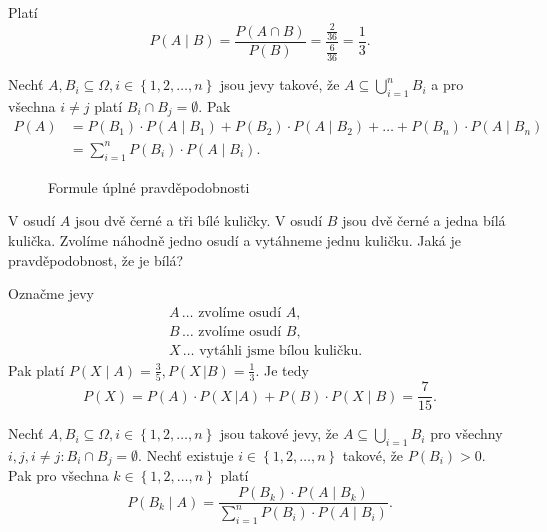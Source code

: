 \begin{reseni}
Platí
$$P(A\mid B)=\frac{P(A\cap B)}{P(B)}=\frac{\frac{2}{36}}{\frac{6}{36}}=\frac{1}{3}.$$
\end{reseni}

\begin{veta}
    Nechť $A,B_i \subseteq \Omega, i \in \left \{ 1, 2, \dots, n \right \} $ jsou jevy
    takové, že $A \subseteq \bigcup\limits_{i=1}^n B_i$ a pro všechna $i\ne j$ platí $B_i\cap B_j=
    \emptyset.$ Pak
    \begin{align*}
    P(A)& =P(B_1)\cdot P(A\mid B_1) + P(B_2)\cdot P(A \mid B_2)+ \dots + P(B_n)\cdot P(A \mid B_n)\\
    &=\sum_{i=1}^n P(B_i)\cdot P(A\mid B_i).
    \end{align*}
    \begin{figure}[h]
	\centering
	\caption{Formule úplné pravděpodobnosti}
    \end{figure}
\end{veta}

\begin{priklad}
V osudí $A$ jsou dvě černé a tři bílé kuličky. V osudí $B$ jsou dvě černé a jedna
bílá kulička. Zvolíme náhodně jedno osudí a vytáhneme jednu kuličku. Jaká
je pravděpodobnost, že je bílá?
\end{priklad}

\begin{reseni}
Označme jevy
\begin{align*}
    &A \,\dots  \textrm{ zvolíme osudí } A,\\
    &B\,\dots  \textrm{ zvolíme osudí } B,\\
    &X\,\dots  \textrm{ vytáhli jsme bílou kuličku}.
\end{align*}
Pak platí
$P(X \mid A) = \frac{3}{5}, P(X \, | B)=\frac{1}{3}.$ Je tedy
$$P(X)=P(A)\cdot P(X \, | A)+P(B)\cdot P(X\mid B)=\frac{7}{15}.$$
\end{reseni}

\begin{veta}
    Nechť $A,B_i \subseteq \Omega, i \in \left \{ 1, 2, \dots, n \right \} $ jsou
    takové jevy, že $A \subseteq \bigcup\limits_{i=1} B_i$ pro všechny $i,j, i\ne j\colon B_i\cap B_j=
    \emptyset.$ Nechť existuje $i \in \left \{ 1, 2, \dots, n \right \}$ takové, že $P(B_i) >0.$
    Pak pro všechna $k\in \left \{ 1, 2, \dots, n \right \}$ platí
    $$P(B_k \mid A)=\frac{P(B_k)\cdot P(A\mid B_k)}{\sum_{i=1}^n P(B_i)\cdot
    P(A\mid B_i)}. $$
\end{veta}

